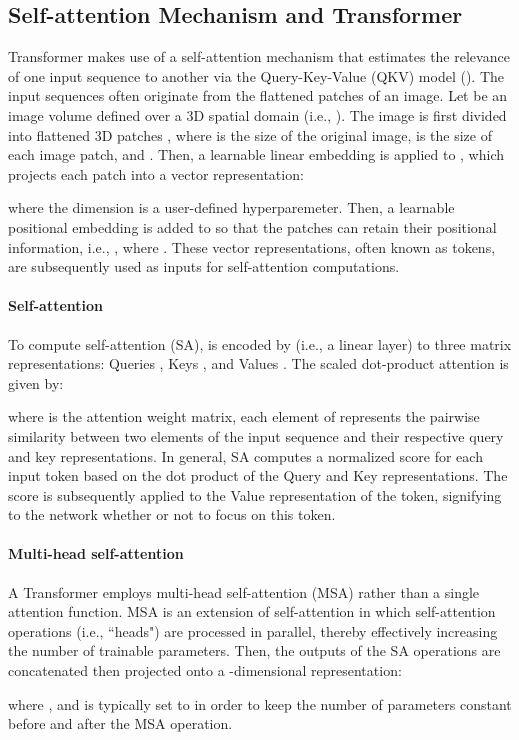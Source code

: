 \documentclass[times,twocolumn,final]{elsarticle}
\begin{document}
\subsection{Self-attention Mechanism and Transformer}
Transformer makes use of a self-attention mechanism that estimates the relevance of one input sequence to another via the Query-Key-Value (QKV) model (\cite{vaswani2017attention, dosovitskiy2020image}). The input sequences often originate from the flattened patches of an image. Let  be an image volume defined over a 3D spatial domain (i.e., ). The image is first divided into  flattened 3D patches  , where  is the size of the original image,  is the size of each image patch, and . Then, a learnable linear embedding  is applied to , which projects each patch into a  vector representation:
\begin{linenomath}

\end{linenomath}
where the dimension  is a user-defined hyperparemeter. Then, a learnable positional embedding is added to  so that the patches can retain their positional information, i.e., , where . These vector representations, often known as tokens, are subsequently used as inputs for self-attention computations.

\paragraph{Self-attention} To compute self-attention (SA),  is encoded by  (i.e., a linear layer) to three matrix representations: Queries , Keys , and Values . The scaled dot-product attention is given by:
\begin{linenomath}

\end{linenomath}
where  is the attention weight matrix, each element of  represents the pairwise similarity between two elements of the input sequence  and their respective query and key representations. In general, SA computes a normalized score for each input token based on the dot product of the Query and Key representations. The score is subsequently applied to the Value representation of the token, signifying to the network whether or not to focus on this token.

\paragraph{Multi-head self-attention} A Transformer employs multi-head self-attention (MSA) rather than a single attention function. MSA is an extension of self-attention in which  self-attention operations (i.e., ``heads") are processed in parallel, thereby effectively increasing the number of trainable parameters. Then, the outputs of the SA operations are concatenated then projected onto a -dimensional representation:
\begin{linenomath}

\end{linenomath}
where , and  is typically set to  in order to keep the number of parameters constant before and after the MSA operation.
\end{document}
